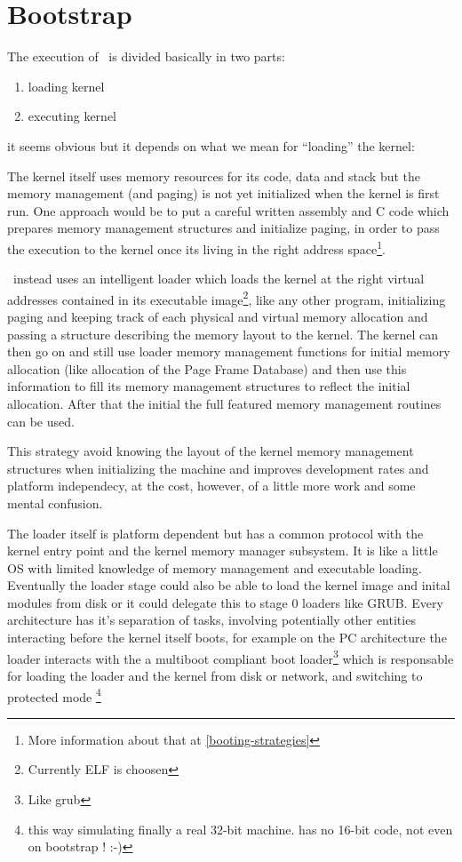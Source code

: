 \section{Bootstrap}

The execution of \acaros\ is divided basically in two parts:

\begin{enumerate}
\item loading kernel
\item executing kernel
\end{enumerate}

\noindent it seems obvious but it depends on what we mean for ``loading''
the kernel:

The kernel itself uses memory resources for its code, data and stack
but the memory management (and paging) is not yet initialized when the kernel is first run.
 One approach would be to put a careful written assembly and C code which prepares 
memory management structures and initialize paging, in order to pass the execution
to the kernel once its living in the right address space\footnote{More information about that at
 \ref{booting-strategies}}.

\acaros\ instead uses an intelligent loader which loads the kernel at the
right virtual addresses contained in its executable image\footnote{Currently ELF is choosen}, 
like any other program, initializing paging and keeping track of each physical and virtual
memory allocation and passing a structure describing the memory layout to the kernel.
 The kernel can then go on and still use loader memory management functions 
for initial memory allocation (like allocation of the Page Frame Database) and then
use this information to fill its memory management structures to reflect the initial allocation.
 After that the initial the full featured memory management routines can be used.
 
This strategy avoid knowing the layout of the kernel memory management structures
when initializing the machine and improves development rates and platform independecy,
at the cost, however, of a little more work and some mental confusion.

The loader itself is platform dependent but has a common protocol with the 
kernel entry point and the kernel memory manager subsystem. It is like a
little OS with limited knowledge of memory management and executable loading. 
Eventually the loader stage could also be able to load the kernel image
and inital modules from disk or it could delegate this to stage 0 loaders
like GRUB.
 Every architecture has it's separation of tasks, involving potentially other entities
interacting before the kernel itself boots, for example on the PC architecture the loader 
interacts with the a multiboot compliant boot loader\footnote{Like grub} which is responsable
for loading the loader and the kernel from disk or network, and switching to protected mode
\footnote{this way simulating finally a real 32-bit machine. \acaros has no 16-bit code, not even on bootstrap ! :-)}

